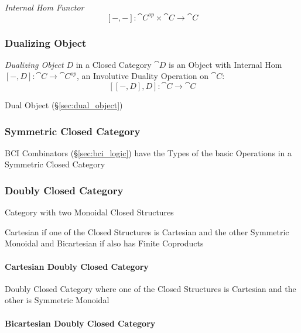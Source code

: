 \emph{Internal Hom Functor}
\[
  [-,-] : \cat{C}^{op} \times \cat{C} \rightarrow \cat{C}
\]



\subsubsection{Dualizing Object}\label{sec:dualizing_object}

\emph{Dualizing Object} $D$ in a Closed Category $\cat{D}$ is an
Object with Internal Hom $[-,D]: \cat{C} \rightarrow \cat{C}^{op}$, an
Involutive Duality Operation on $\cat{C}$: %
\[
  [[-,D],D]: \cat{C} \rightarrow \cat{C}
\]

Dual Object (\S\ref{sec:dual_object})



\subsubsection{Symmetric Closed Category}
\label{sec:symmetric_closed_category}

BCI Combinators (\S\ref{sec:bci_logic}) have the Types of the basic
Operations in a Symmetric Closed Category



\subsubsection{Doubly Closed Category}\label{sec:doubly_closed_category}

Category with two Monoidal Closed Structures

Cartesian if one of the Closed Structures is Cartesian and the other
Symmetric Monoidal and Bicartesian if also has Finite Coproducts



\paragraph{Cartesian Doubly Closed Category}
\label{sec:cartesian_doubly_closed}\hfill

Doubly Closed Category where one of the Closed Structures is Cartesian
and the other is Symmetric Monoidal



\paragraph{Bicartesian Doubly Closed Category}
\label{sec:bicartesian_doubly_closed}\hfill

